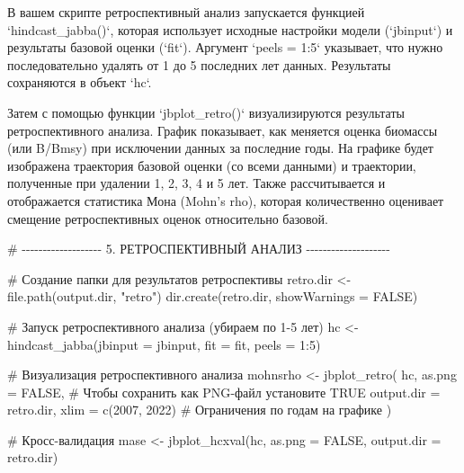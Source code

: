 \documentclass[
  letterpaper,
  DIV=11,
  numbers=noendperiod]{scrreprt}
\newenvironment{Shaded}{\begin{snugshade}}{\end{snugshade}}
\newcommand{\AttributeTok}[1]{\textcolor[rgb]{0.40,0.45,0.13}{#1}}
\newcommand{\CommentTok}[1]{\textcolor[rgb]{0.37,0.37,0.37}{#1}}
\newcommand{\ConstantTok}[1]{\textcolor[rgb]{0.56,0.35,0.01}{#1}}
\newcommand{\DecValTok}[1]{\textcolor[rgb]{0.68,0.00,0.00}{#1}}
\newcommand{\FunctionTok}[1]{\textcolor[rgb]{0.28,0.35,0.67}{#1}}
\newcommand{\NormalTok}[1]{\textcolor[rgb]{0.00,0.23,0.31}{#1}}
\newcommand{\OtherTok}[1]{\textcolor[rgb]{0.00,0.23,0.31}{#1}}
\newcommand{\SpecialCharTok}[1]{\textcolor[rgb]{0.37,0.37,0.37}{#1}}
\newcommand{\StringTok}[1]{\textcolor[rgb]{0.13,0.47,0.30}{#1}}
\begin{document}
В вашем скрипте ретроспективный анализ запускается функцией
`hindcast\_jabba()`, которая использует исходные настройки модели
(`jbinput`) и результаты базовой оценки (`fit`). Аргумент `peels = 1:5`
указывает, что нужно последовательно удалять от 1 до 5 последних лет
данных. Результаты сохраняются в объект `hc`.

Затем с помощью функции `jbplot\_retro()` визуализируются результаты
ретроспективного анализа. График показывает, как меняется оценка
биомассы (или B/Bmsy) при исключении данных за последние годы. На
графике будет изображена траектория базовой оценки (со всеми данными) и
траектории, полученные при удалении 1, 2, 3, 4 и 5 лет. Также
рассчитывается и отображается статистика Мона (Mohn's rho), которая
количественно оценивает смещение ретроспективных оценок относительно
базовой.

\begin{Shaded}
\begin{Highlighting}[]
\CommentTok{\# {-}{-}{-}{-}{-}{-}{-}{-}{-}{-}{-}{-}{-}{-}{-}{-}{-}{-}{-} 5. РЕТРОСПЕКТИВНЫЙ АНАЛИЗ {-}{-}{-}{-}{-}{-}{-}{-}{-}{-}{-}{-}{-}{-}{-}{-}{-}{-}{-}{-}}

\CommentTok{\# Создание папки для результатов ретроспективы}
\NormalTok{retro.dir }\OtherTok{\textless{}{-}} \FunctionTok{file.path}\NormalTok{(output.dir, }\StringTok{"retro"}\NormalTok{)}
\FunctionTok{dir.create}\NormalTok{(retro.dir, }\AttributeTok{showWarnings =} \ConstantTok{FALSE}\NormalTok{)}

\CommentTok{\# Запуск ретроспективного анализа (убираем по 1{-}5 лет)}
\NormalTok{hc }\OtherTok{\textless{}{-}} \FunctionTok{hindcast\_jabba}\NormalTok{(}\AttributeTok{jbinput =}\NormalTok{ jbinput, }\AttributeTok{fit =}\NormalTok{ fit, }\AttributeTok{peels =} \DecValTok{1}\SpecialCharTok{:}\DecValTok{5}\NormalTok{)}

\CommentTok{\# Визуализация ретроспективного анализа}
\NormalTok{mohnsrho }\OtherTok{\textless{}{-}} \FunctionTok{jbplot\_retro}\NormalTok{(}
\NormalTok{  hc, }
  \AttributeTok{as.png =} \ConstantTok{FALSE}\NormalTok{,         }\CommentTok{\# Чтобы сохранить как PNG{-}файл установите TRUE}
  \AttributeTok{output.dir =}\NormalTok{ retro.dir,}
  \AttributeTok{xlim =} \FunctionTok{c}\NormalTok{(}\DecValTok{2007}\NormalTok{, }\DecValTok{2022}\NormalTok{)   }\CommentTok{\# Ограничения по годам на графике}
\NormalTok{)}

\CommentTok{\# Кросс{-}валидация}
\NormalTok{mase }\OtherTok{\textless{}{-}} \FunctionTok{jbplot\_hcxval}\NormalTok{(hc, }\AttributeTok{as.png =} \ConstantTok{FALSE}\NormalTok{, }\AttributeTok{output.dir =}\NormalTok{ retro.dir)}
\end{Highlighting}
\end{Shaded}
\end{document}

